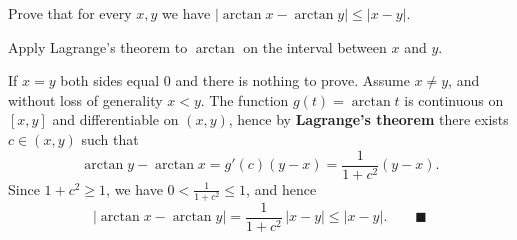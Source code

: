 
\begin{question}
Prove that for every $x,y$ we have $|\arctan x-\arctan y|\le|x-y|$.
\end{question}

\begin{hint}
Apply Lagrange's theorem to $\arctan$ on the interval between $x$ and $y$.
\end{hint}

\begin{solution}
If $x=y$ both sides equal $0$ and there is nothing to prove. Assume $x\neq y$, and without loss of generality $x<y$. The function $g(t)=\arctan t$ is continuous on $[x,y]$ and differentiable on $(x,y)$, hence by \textbf{Lagrange's theorem} there exists $c\in(x,y)$ such that
\[ \arctan y-\arctan x=g'(c)(y-x)=\frac{1}{1+c^2}(y-x). \]
Since $1+c^2\ge 1$, we have $0<\frac{1}{1+c^2}\le 1$, and hence
\[ |\arctan x-\arctan y|=\frac{1}{1+c^2}\,|x-y|\le|x-y|. \qquad\blacksquare \]
\end{solution}
